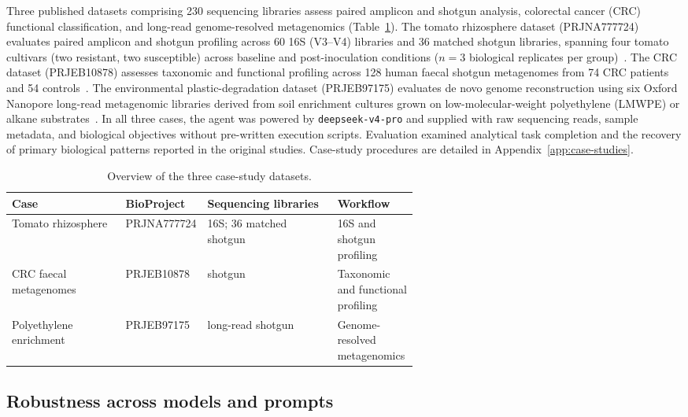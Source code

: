 \documentclass[10pt,letterpaper]{article}
\begin{document}
Three published datasets comprising 230 sequencing libraries assess paired
amplicon and shotgun analysis, colorectal cancer (CRC) functional
classification, and long-read genome-resolved metagenomics
(Table~\ref{tab:cases}). The tomato rhizosphere dataset (PRJNA777724) evaluates
paired amplicon and shotgun profiling across 60 16S (V3--V4) libraries and 36
matched shotgun libraries, spanning four tomato cultivars (two resistant, two
susceptible) across baseline and post-inoculation conditions ($n = 3$
biological replicates per group)~\cite{yin2022tomato}. The CRC dataset
(PRJEB10878) assesses taxonomic and functional profiling across 128 human
faecal shotgun metagenomes from 74 CRC patients and 54
controls~\cite{yu2017crc}. The environmental plastic-degradation dataset
(PRJEB97175) evaluates de novo genome reconstruction using six Oxford Nanopore
long-read metagenomic libraries derived from soil enrichment cultures grown on
low-molecular-weight polyethylene (LMWPE) or alkane
substrates~\cite{sandholm2025polyethylene}. In all three cases, the agent was
powered by \texttt{deepseek-v4-pro} and supplied with raw sequencing reads,
sample metadata, and biological objectives without pre-written execution
scripts. Evaluation examined analytical task completion and the recovery of
primary biological patterns reported in the original studies. Case-study
procedures are detailed in Appendix~\ref{app:case-studies}.

\begin{table}[t]
\centering
\caption{Overview of the three case-study datasets.}
\label{tab:cases}
\normalsize
\setlength{\tabcolsep}{4pt}
\renewcommand{\arraystretch}{1.12}
\begin{tabularx}{\linewidth}{@{}>{\raggedright\arraybackslash}p{0.28\linewidth}l>{\raggedright\arraybackslash}p{0.32\linewidth}>{\raggedright\arraybackslash}X@{}}
\toprule
Case & BioProject & Sequencing libraries & Workflow \\
\midrule
Tomato rhizosphere
  & PRJNA777724
  & 60 16S; 36 matched shotgun
  & 16S and shotgun profiling \\
CRC faecal metagenomes
  & PRJEB10878
  & 128 shotgun
  & Taxonomic and functional profiling \\
Polyethylene enrichment
  & PRJEB97175
  & 6 long-read shotgun
  & Genome-resolved metagenomics \\
\bottomrule
\end{tabularx}
\end{table}

\subsection{Robustness across models and prompts}
\end{document}
